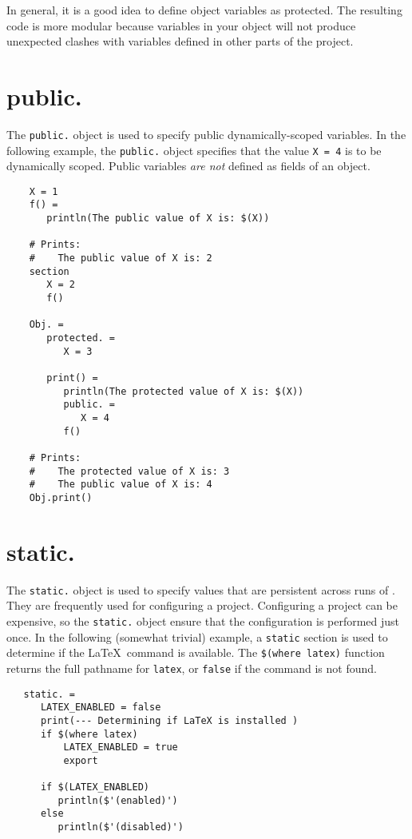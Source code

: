 In general, it is a good idea to define object variables as protected.  The resulting code is more
modular because variables in your object will not produce unexpected clashes with variables defined
in other parts of the project.

\section{public.}
\label{section:public}

The \verb+public.+ object is used to specify public dynamically-scoped variables.  In the following
example, the \verb+public.+ object specifies that the value \verb+X = 4+ is to be dynamically
scoped.  Public variables \emph{are not} defined as fields of an object.

\begin{verbatim}
    X = 1
    f() =
       println(The public value of X is: $(X))

    # Prints:
    #    The public value of X is: 2
    section
       X = 2
       f()

    Obj. =
       protected. =
          X = 3

       print() =
          println(The protected value of X is: $(X))
          public. =
             X = 4
          f()

    # Prints:
    #    The protected value of X is: 3
    #    The public value of X is: 4
    Obj.print()
\end{verbatim}

\section{static.}

The \verb+static.+ object is used to specify values that are persistent across runs of \OMake{}.  They
are frequently used for configuring a project.  Configuring a project can be expensive, so the
\verb+static.+ object ensure that the configuration is performed just once.  In the following
(somewhat trivial) example, a \verb+static+ section is used to determine if the \LaTeX\ command is
available.  The \verb+$(where latex)+ function returns the full pathname for \verb+latex+, or
\verb+false+ if the command is not found.

\begin{verbatim}
   static. =
      LATEX_ENABLED = false
      print(--- Determining if LaTeX is installed )
      if $(where latex)
          LATEX_ENABLED = true
          export

      if $(LATEX_ENABLED)
         println($'(enabled)')
      else
         println($'(disabled)')
\end{verbatim}

